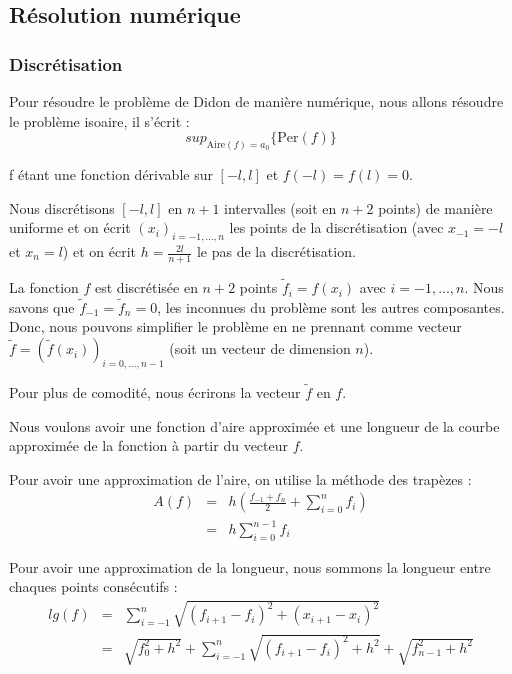 \documentclass[10pt,a4paper]{article}
\newcommand{\A}{\mathrm{Aire}}
\newcommand{\p}{\mathrm{Per}}
\theoremstyle{plain}
\theoremstyle{definition}
\begin{document}
\subsection{Résolution numérique}

\subsubsection{Discrétisation}

Pour résoudre le problème de Didon de manière numérique, nous allons résoudre le problème isoaire, il s'écrit :
\[ sup_{\A(f)=a_0} \{ \p(f) \} \]

f étant une fonction dérivable sur $[-l, l]$ et $f(-l)=f(l)=0$.
\newline

Nous discrétisons $[-l, l]$ en $n+1$ intervalles (soit en $n+2$ points) de manière uniforme et on écrit $(x_i)_{i=-1,...,n}$ les points de la discrétisation (avec  $x_{-1}=-l$ et $x_n=l$) et on écrit $h=\frac{2l}{n+1}$ le pas de la discrétisation.

La fonction $f$ est discrétisée en $n+2$ points $\tilde{f}_i = f(x_i)$ avec $i=-1,...,n$. Nous savons que $\tilde{f}_{-1} = \tilde{f}_n = 0$, les inconnues du problème sont les autres composantes. Donc, nous pouvons simplifier le problème en ne prennant comme vecteur $\tilde{f} = (\tilde{f}(x_i))_{i=0,...,n-1}$ (soit un vecteur de dimension $n$).

Pour plus de comodité, nous écrirons la vecteur $\tilde{f}$ en $f$.
\newline

Nous voulons avoir une fonction d'aire approximée et une longueur de la courbe approximée de la fonction à partir du vecteur $f$.

Pour avoir une approximation de l'aire, on utilise la méthode des trapèzes :
\begin{eqnarray*}
A(f) &=& h (\frac{f_{-1}+f_n}{2} + \sum_{i=0}^{n}{f_i}) \\
&=& h \sum_{i=0}^{n-1}{f_i}
\end{eqnarray*}

Pour avoir une approximation de la longueur, nous sommons la longueur entre chaques points consécutifs :
\begin{eqnarray*}
lg(f) &=& \sum_{i=-1}^{n}{\sqrt{(f_{i+1}-f_i)^2+(x_{i+1}-x_i)^2}}\\
&=& \sqrt{f_0^2+h^2} + \sum_{i=-1}^{n}{\sqrt{(f_{i+1}-f_i)^2+h^2}} + \sqrt{f_{n-1}^2+h^2} 
\end{eqnarray*}
\end{document}

